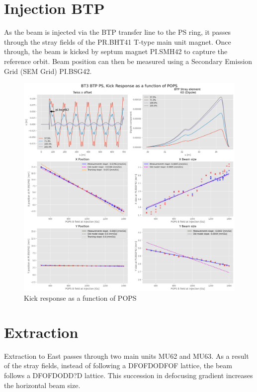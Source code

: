 \documentclass[a4paper,
               biblatex,     %
               keeplastbox,   %
               ]{jacow}
\begin{document}
\section{Injection BTP}

As the beam is injected via the BTP transfer line to the PS ring, it passes through the stray fields of the PR.BHT41 T-type main unit magnet. Once through, the beam is kicked by septum magnet PI.SMH42 to capture the reference orbit. Beam position can then be measured using a Secondary Emission Grid (SEM Grid) PI.BSG42.

\begin{figure}[!htb]
   \centering
   \includegraphics*[width=1.0\columnwidth]{kick_response_old_model.png}
   \caption{Kick response as a function of POPS}
   \label{fig:kick_response_old_model}
\end{figure}

\section{Extraction}

Extraction to East passes through two main units MU62 and MU63. As a result of the stray fields, instead of following a DFOFDODFOF lattice, the beam follows a DFOFDODD?D lattice. This succession in defocusing gradient increases the horizontal beam size.
\end{document}
